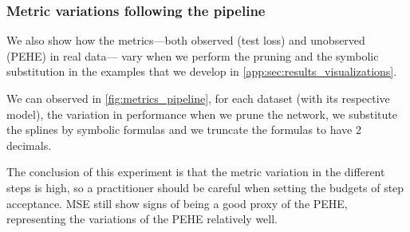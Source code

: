 \subsubsection{Metric variations following the pipeline}
\label{app:sec:metrics_pipeline}

We also show how the metrics---both observed (test loss) and unobserved (PEHE) in real data--- vary when we perform the pruning and the symbolic substitution in the examples that we develop in \cref{app:sec:results_visualizations}.

We can observed in \cref{fig:metrics_pipeline}, for each dataset (with its respective model), the variation in performance when \itemi we prune the network, \itemii we substitute the splines by symbolic formulas and \itemiii we truncate the formulas to have 2 decimals.

The conclusion of this experiment is that the metric variation in the different steps is high, so a practitioner should be careful when setting the budgets of step acceptance. MSE still show signs of being a good proxy of the PEHE, representing the variations of the PEHE relatively well.


